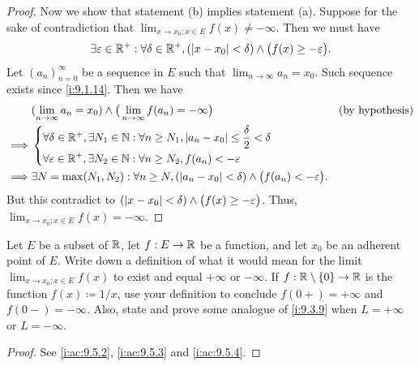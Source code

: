 \begin{proof}
  Now we show that statement (b) implies statement (a).
  Suppose for the sake of contradiction that \(\lim_{x \to x_0 ; x \in E} f(x) \neq -\infty\).
  Then we must have
  \[
    \exists \varepsilon \in \mathbb{R}^+ : \forall \delta \in \mathbb{R}^+, (\left\lvert x - x_0\right\rvert < \delta) \land \big(f(x) \geq -\varepsilon\big).
  \]
  Let \((a_n)_{n = 0}^\infty\) be a sequence in \(E\) such that \(\lim_{n \to \infty} a_n = x_0\).
  Such sequence exists since \cref{i:9.1.14}.
  Then we have
  \begin{align*}
             & (\lim_{n \to \infty} a_n = x_0) \land \big(\lim_{n \to \infty} f(a_n) = -\infty\big)                                 &  & \text{(by hypothesis)} \\
    \implies & \begin{dcases}
                 \forall \delta \in \mathbb{R}^+, \exists N_1 \in \mathbb{N} : \forall n \geq N_1, \left\lvert a_n - x_0\right\rvert \leq \dfrac{\delta}{2} < \delta \\
                 \forall \varepsilon \in \mathbb{R}^+, \exists N_2 \in \mathbb{N} : \forall n \geq N_2, f(a_n) < -\varepsilon
               \end{dcases}                                \\
    \implies & \exists N = \max(N_1, N_2) : \forall n \geq N, (\left\lvert a_n - x_0\right\rvert < \delta) \land \big(f(a_n) < -\varepsilon\big).
  \end{align*}
  But this contradict to \((\left\lvert x - x_0\right\rvert < \delta) \land \big(f(x) \geq -\varepsilon\big)\).
  Thus, \(\lim_{x \to x_0 ; x \in E} f(x) = -\infty\).
\end{proof}

\exercisesection

\begin{ex}\label{i:ex:9.5.1}
  Let \(E\) be a subset of \(\mathbb{R}\), let \(f : E \to \mathbb{R}\) be a function, and let \(x_0\) be an adherent point of \(E\).
  Write down a definition of what it would mean for the limit \(\lim_{x \to x_0 ; x \in E} f(x)\) to exist and equal \(+\infty\) or \(-\infty\).
  If \(f : \mathbb{R} \setminus \left\lbrace0\right\rbrace \to \mathbb{R}\) is the function \(f(x) \coloneqq 1 / x\), use your definition to conclude \(f(0+) = +\infty\) and \(f(0-) = -\infty\).
  Also, state and prove some analogue of \cref{i:9.3.9} when \(L = +\infty\) or \(L = -\infty\).
\end{ex}

\begin{proof}
  See \cref{i:ac:9.5.2}, \cref{i:ac:9.5.3} and \cref{i:ac:9.5.4}.
\end{proof}

